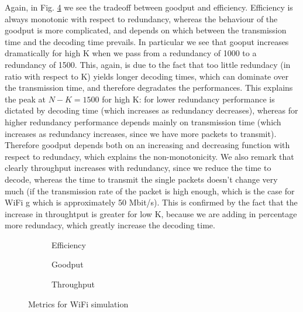 Again, in Fig. \ref{fig:wifi} we see the tradeoff between goodput and efficiency. Efficiency is always monotonic with respect to redundancy, whereas the behaviour of the goodput is more complicated, and depends on which between the transmission time and the decoding time prevails. In particular we see that gooput increases dramatically for high K when we pass from a redundancy of 1000 to a redundancy of 1500. This, again, is due to the fact that too little redundacy (in ratio with respect to K) yields longer decoding times, which can dominate over the transmission time, and therefore degradates the performances. This explains the peak at $N-K=1500$ for high K: for lower redundancy performance is dictated by decoding time (which increases as redundancy decreases), whereas for higher redundancy performance depends mainly on transmission time (which increases as redundancy increases, since we have more packets to transmit). Therefore goodput depends both on an increasing and decreasing function with respect to redundacy, which explains the non-monotonicity.  We also remark that clearly throughput increases with redundancy, since we reduce the time to decode, whereas the time to transmit the single packets doesn't change very much (if the transmission rate of the packet is high enough, which is the case for WiFi g which is approximately 50 Mbit/s). This is confirmed by the fact that the increase in throughtput is greater for low K, because we are adding in percentage more redundacy, which greatly increase the decoding time. 
\begin{figure}[!hp]
\centering
\begin{subfigure}{0.23\textwidth}
	\captionsetup{justification=centering,font=scriptsize}
	\centering
	\setlength\fwidth{\textwidth}
	\setlength{}
	
	\caption{Efficiency}
	\label{fig:wifi_eff}
\end{subfigure}\hspace{2em}%
\begin{subfigure}{0.23\textwidth}
	\captionsetup{justification=centering,font=scriptsize}
	\centering
	\setlength\fwidth{\textwidth}
	\setlength{}
	
	\caption{Goodput}
	\label{fig:wifi_good}
\end{subfigure}\hspace{2em}%
\begin{subfigure}{0.23\textwidth}
	\captionsetup{justification=centering,font=scriptsize}
	\centering
	\setlength\fwidth{\textwidth}
	\setlength{}
	
	\caption{Throughput}
	\label{fig:wifi_thr}
\end{subfigure}
\caption{Metrics for WiFi simulation}
\label{fig:wifi}
\end{figure}
